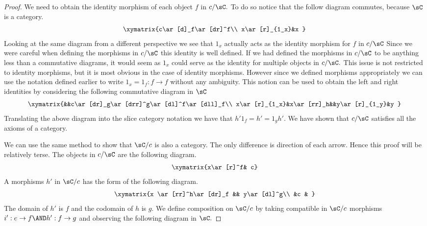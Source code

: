 \documentclass[main.tex]{subfiles}
\begin{document}
\begin{proof}
	We need to obtain the identity morphism of each object \(f\) in
	\(c/\sC.\) To do so notice that the follow diagram commutes, because
	\(\sC\) is a category.
	\[ \xymatrix{c\ar[d]_f\ar[dr]^f\\ x\ar[r]_{1_x}&x } \]
	Looking at the same diagram from a different perspective we see that
	\(1_x\) actually acts as the identity morphism for \(f\) in \(c/\sC\)
	Since we were careful when defining the morphisms in \(c/\sC\) this
	identity is well defined. If we had defined the morphisms in \(c/\sC\)
	to be anything less than a commutative diagrams, it would seem as
	\(1_x\) could serve as the identity for multiple objects in \(c/\sC.\)
	This issue is not restricted to identity morphisms, but it is most
	obvious in the case of identity morphisms. However since we defined
	morphisms appropriately we can use the notation defined earlier to write
	\(1_{x}=1_{f}:f\to f\) without any ambiguity. This notion can be used to
	obtain the left and right identities by considering the following
	commutative diagram in \(\sC\)
	\[\xymatrix{&&c\ar[dr]_g\ar[drr]^g\ar[dl]^f\ar[dll]_f\\
	x\ar[r]_{1_x}&x\ar[rr]_h&&y\ar[r]_{1_y}&y }\]
	Translating the above diagram into the slice category notation we have
	that \(h'1_{f}= h'=1_{g}h'.\) We have shown that \(c/\sC\) satisfies all
	the axioms of a category.

	We can use the same method to show that \(\sC/c\) is also a category.
	The only difference is direction of each arrow. Hence this proof will be
	relatively terse. The objects in \(c/\sC\) are the following diagram.
	\[\xymatrix{x\ar[r]^f& c}\]
	A morphisms  \(h'\) in \(\sC/c\) has the form of the following diagram.
	\[\xymatrix{x \ar[rr]^h\ar[dr]_f && y\ar[dl]^g\\ &c & }\]
	The domain of \(h'\) is \(f\) and the codomain of \(h\) is \(g.\) We
	define composition on \(\sC/c\) by taking compatible in \(\sC/c\)
	morphisms \(i':e\to f\AND h':f\to g\) and observing the following
	diagram in \(\sC.\)


\end{proof}
\end{document}
